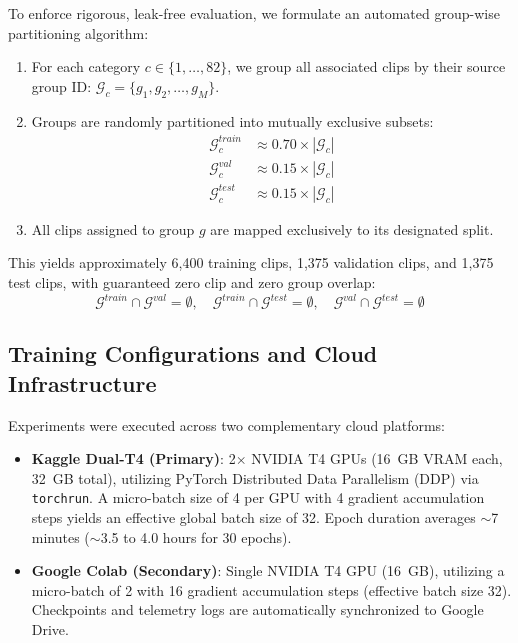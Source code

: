 To enforce rigorous, leak-free evaluation, we formulate an automated group-wise partitioning algorithm:
\begin{enumerate}
    \item For each category $c \in \{1, \dots, 82\}$, we group all associated clips by their source group ID: $\mathcal{G}_c = \{g_1, g_2, \dots, g_M\}$.
    \item Groups are randomly partitioned into mutually exclusive subsets:
    \begin{align}
        \mathcal{G}_c^{train} &\approx 0.70 \times |\mathcal{G}_c| \\
        \mathcal{G}_c^{val} &\approx 0.15 \times |\mathcal{G}_c| \\
        \mathcal{G}_c^{test} &\approx 0.15 \times |\mathcal{G}_c|
    \end{align}
    \item All clips assigned to group $g$ are mapped exclusively to its designated split.
\end{enumerate}
This yields approximately 6,400 training clips, 1,375 validation clips, and 1,375 test clips, with guaranteed zero clip and zero group overlap:
\begin{equation}
\mathcal{G}^{train} \cap \mathcal{G}^{val} = \emptyset, \quad \mathcal{G}^{train} \cap \mathcal{G}^{test} = \emptyset, \quad \mathcal{G}^{val} \cap \mathcal{G}^{test} = \emptyset
\end{equation}

\subsection{Training Configurations and Cloud Infrastructure}
Experiments were executed across two complementary cloud platforms:
\begin{itemize}
    \item \textbf{Kaggle Dual-T4 (Primary)}: 2$\times$ NVIDIA T4 GPUs (16~GB VRAM each, 32~GB total), utilizing PyTorch Distributed Data Parallelism (DDP) via \texttt{torchrun}. A micro-batch size of 4 per GPU with 4 gradient accumulation steps yields an effective global batch size of 32. Epoch duration averages $\sim$7 minutes ($\sim$3.5 to 4.0 hours for 30 epochs).
    \item \textbf{Google Colab (Secondary)}: Single NVIDIA T4 GPU (16~GB), utilizing a micro-batch of 2 with 16 gradient accumulation steps (effective batch size 32). Checkpoints and telemetry logs are automatically synchronized to Google Drive.
\end{itemize}


